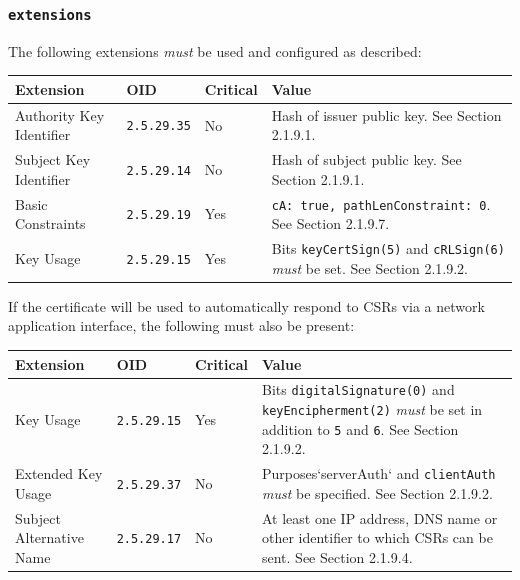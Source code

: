\subsubsection{\texttt{extensions}}

The following extensions \textit{must} be used and configured as described:

\vspace*{0.5cm}
\noindent\begin{tabularx}{\textwidth}{| p{4cm} | p{2cm} | p{1.2cm} | X |} \hline
\rowcolor{gray!33} Extension & OID                & Critical & Value \\ \hline

Authority Key Identifier     & \texttt{2.5.29.35} & No       & Hash of issuer public key. See Section 2.1.9.1. \\ \hline
Subject Key Identifier       & \texttt{2.5.29.14} & No       & Hash of subject public key. See Section 2.1.9.1. \\ \hline
Basic Constraints            & \texttt{2.5.29.19} & Yes      & \texttt{cA: true, pathLenConstraint: 0}. See Section 2.1.9.7. \\ \hline
Key Usage                    & \texttt{2.5.29.15} & Yes      & Bits \texttt{keyCertSign(5)} and \texttt{cRLSign(6)} \textit{must} be set. See Section 2.1.9.2. \\ \hline

\end{tabularx}
\vspace*{0.5cm}

If the certificate will be used to automatically respond to CSRs via a network application interface, the following must also be present:

\vspace*{0.5cm}
\noindent\begin{tabularx}{\textwidth}{| p{4cm} | p{2cm} | p{1.2cm} | X |} \hline
\rowcolor{gray!33} Extension & OID                & Critical & Value \\ \hline

Key Usage                    & \texttt{2.5.29.15} & Yes      & Bits \texttt{digitalSignature(0)} and \texttt{keyEncipherment(2)} \textit{must} be set in addition to \texttt{5} and \texttt{6}. See Section 2.1.9.2. \\ \hline
Extended Key Usage           & \texttt{2.5.29.37} & No       & Purposes`serverAuth` and \texttt{clientAuth} \textit{must} be specified. See Section 2.1.9.2. \\ \hline
Subject Alternative Name     & \texttt{2.5.29.17} & No       & At least one IP address, DNS name or other identifier to which CSRs can be sent. See Section 2.1.9.4. \\ \hline

\end{tabularx}
\vspace*{0.5cm}

